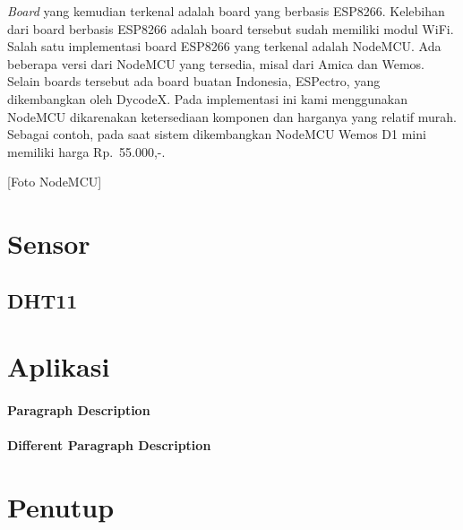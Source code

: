 \documentclass[
10pt, %
a4paper, %
oneside, %
headinclude,footinclude, %
BCOR5mm, %
]{scrartcl}
\begin{document}
{\em Board} yang kemudian terkenal adalah board yang berbasis ESP8266.
Kelebihan dari board berbasis ESP8266 adalah board tersebut sudah memiliki
modul WiFi. Salah satu implementasi board ESP8266 yang terkenal adalah NodeMCU.
Ada beberapa versi dari NodeMCU yang tersedia, misal dari Amica dan Wemos.
Selain boards tersebut ada board buatan Indonesia, ESPectro, yang dikembangkan
oleh DycodeX. Pada implementasi ini kami menggunakan NodeMCU dikarenakan
ketersediaan komponen dan harganya yang relatif murah. Sebagai contoh, pada
saat sistem dikembangkan NodeMCU Wemos D1 mini memiliki harga Rp.~55.000,-.

[Foto NodeMCU]

\section{Sensor}
\subsection{DHT11}

\section{Aplikasi}

\paragraph{Paragraph Description} \lipsum[7] %

\paragraph{Different Paragraph Description} \lipsum[8] %


\section{Penutup}



\renewcommand{\refname}{\spacedlowsmallcaps{References}} %



\end{document}
